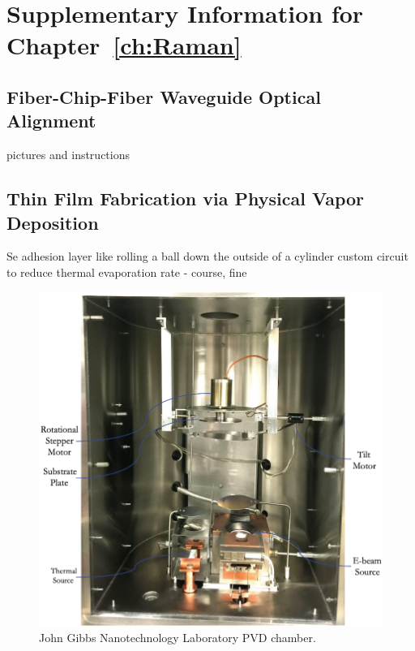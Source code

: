 \chapter{Supplementary Information for Chapter~\ref{ch:Raman}}
\label{appendix: Raman}
\acresetall

\section{Fiber-Chip-Fiber Waveguide Optical Alignment}
\label{Raman:Appendix:sec:WaveguideAlignment}

pictures and instructions

\section{Thin Film Fabrication via Physical Vapor Deposition}
\label{Raman:Appendix:sec:ThinFilmFabricationViaPVD}

Se adhesion layer
like rolling a ball down the outside of a cylinder
custom circuit to reduce thermal evaporation rate - course, fine

\begin{figure}[t]
  \centering
  \includegraphics[width=\textwidth]{figs/4-Raman/DepositionChamber.png}
  \caption{John Gibbs Nanotechnology Laboratory \ac{PVD} chamber.}
  \label{fig:Raman:DepositionChamber}
\end{figure}

